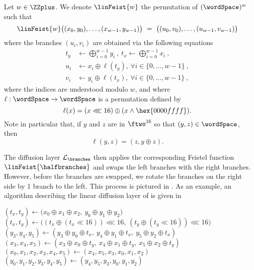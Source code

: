 \begin{definition}
  Let $w \in \ZZplus$. We denote $\linFeist{w}$ the permutation of $(\wordSpace)^w$ such that
  \begin{equation*}
    \linFeist{w}\big( (x_{0},y_{0}), \dots, (x_{w-1},y_{w-1}) \big)
    ~=~
    \big( (u_{0},v_{0}), \dots, (u_{w-1}, v_{w-1}) \big)
  \end{equation*}
  where the branches $(u_{i}, v_{i})$ are obtained via the following equations
  \begin{equation}
    \label{eq:definition-L}
    \begin{split}
      t_y &\gets \bigoplus_{i = 0}^{w-1} y_{i} ~,~ t_x \gets \bigoplus_{i = 0}^{w-1} x_{i} ~, \\
      u_{i} &\gets x_{i} \oplus \ell(t_y), ~\forall i \in \{ 0,...,w-1 \} ~, \\
      v_{i} &\gets y_{i} \oplus \ell(t_x), ~\forall i \in \{ 0,...,w-1 \} ~,
    \end{split}
  \end{equation}
  where the indices are understood modulo $w$, and where $\ell : \wordSpace \to \wordSpace$ is a permutation defined by
  \begin{equation*}
    \ell(x) = (x \lll 16) \oplus (x \land \hex{0000ffff}).
  \end{equation*}
  Note in particular that, if $y$ and $z$ are in $\ftwo^{16}$ so that $(y, z) \in \wordSpace$, then
  \begin{equation*}
    \ell(y, z) = (z, y \oplus z).
  \end{equation*}
\end{definition}

The diffusion layer $\mathcal{L}_{\branches}$ then applies the corresponding Feistel function $\linFeist{\halfbranches}$ and swaps the left branches with the right branches. However, before the branches are swapped, we rotate the branches on the right side by 1 branch to the left. This process is pictured in . 
As an example, an algorithm describing the linear diffusion layer of  is given in 

\begin{algorithm}
  \begin{algorithmic}
    \State{} 
    \State $(t_x,t_y) \gets \big(x_0 \oplus x_1 \oplus x_2, ~ y_0 \oplus y_1 \oplus y_2)$
    \State $(t_x,t_y) \gets \big((t_x \oplus (t_x \ll 16)) \lll 16, ~ (t_y  \oplus (t_y \ll 16)) \lll 16\big)$
    \State $(y_3,y_4,y_5) \gets (y_3 \oplus y_0 \oplus t_x, ~y_4 \oplus y_1 \oplus t_x, ~y_5 \oplus y_2 \oplus t_x)$
    \State $(x_3,x_4,x_5) \gets (x_3 \oplus x_0 \oplus t_y, ~x_4 \oplus x_1 \oplus t_y, ~x_5 \oplus x_2 \oplus t_y)$
    \State{} 
    \State $(x_0,x_1,x_2,x_3,x_4,x_5) \gets (x_4,x_5,x_3,x_0,x_1,x_2)$
    \State $(y_0,y_1,y_2,y_3,y_4,y_5) \gets (y_4,y_5,y_3,y_0,y_1,y_2)$
  \end{algorithmic}
\end{algorithm}